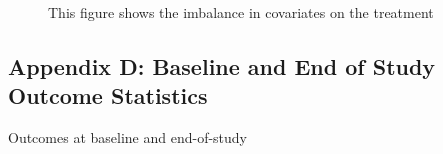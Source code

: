 \documentclass[
  single column]{article}
\begin{document}
\begin{figure}


\caption{\label{fig-match_1}This figure shows the imbalance in
covariates on the treatment}

\end{figure}%

\subsection{Appendix D: Baseline and End of Study Outcome
Statistics}\label{appendix-outcomes}

\begin{table}

\caption{\label{tbl-table-outcomes}Outcomes at baseline and
end-of-study}

\centering{

}
\end{table}
\end{document}
